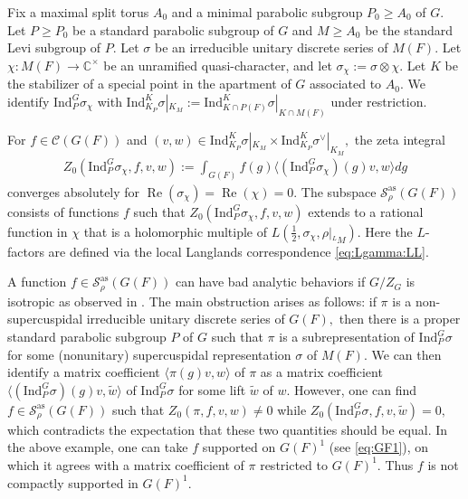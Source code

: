 \documentclass[10pt]{amsart}
\theoremstyle{definition}
\numberwithin{equation}{section}
\numberwithin{equation}{subsection}
\newcommand{\Ind}{\mathrm{Ind}}
\newcommand{\CC}{\mathbb{C}}
\renewcommand{\Re}{\mathop{\mathrm{Re}}}
\begin{document}
Fix a maximal split torus $A_0$ and a minimal parabolic subgroup $P_0\ge A_0$ of $G$. Let $P\ge P_0$ be a standard parabolic subgroup of $G$ and $M\ge A_0$ be the standard Levi subgroup of $P$. Let $\sigma$ be an irreducible unitary discrete series of $M(F)$. Let $\chi:M(F)\to \CC^\times$ be an unramified quasi-character, and let $\sigma_\chi:=\sigma\otimes \chi.$ Let $K$ be the stabilizer of a special point in the apartment of $G$ associated to $A_0$. We identify $\mathrm{Ind}_P^G\sigma_\chi$ with $\Ind_{K_P}^K\sigma|_{K_M}:=\Ind_{K\cap P(F)}^K\sigma|_{K\cap M(F)}$ under restriction.

For $f\in \mathcal{C}(G(F))$ and $(v,w)\in \Ind_{K_P}^K\sigma|_{K_M}\times \Ind_{K_P}^K\sigma^\lor|_{K_M},$ the zeta integral 
\begin{align*}
    Z_0(\mathrm{Ind}_P^G \sigma_\chi,f,v,w):=\int_{G(F)} f(g)\langle (\mathrm{Ind}_P^G\sigma_\chi)(g)v,w\rangle dg
\end{align*} 
converges absolutely for $\Re (\sigma_\chi)=\Re(\chi)=0.$ The subspace  $\mathcal{S}^{\mathrm{as}}_\rho(G(F))$ consists of functions $f$ such that $Z_0(\mathrm{Ind}_P^G \sigma_\chi,f,v,w)$ extends to a rational function in $\chi$ that is a holomorphic multiple of $L(\tfrac{1}{2},\sigma_\chi,\rho|_{{}^LM})$. Here the $L$-factors are defined via the local Langlands correspondence \eqref{eq:Lgamma:LL}. 

A function $f\in \mathcal{S}_\rho^{\mathrm{as}}(G(F))$ can have bad analytic behaviors if $G/Z_G$ is isotropic as observed in \cite[Example 6.2]{DRS}. The main obstruction arises as follows: if $\pi$ is a non-supercuspidal irreducible unitary discrete series of $G(F),$ then there is a proper standard parabolic subgroup $P$ of $G$  such that $\pi$ is a subrepresentation of $\Ind_P^G \sigma$ for some (nonunitary) supercuspidal representation $\sigma$ of $M(F).$ We can then identify a matrix coefficient $\langle \pi(g)v,w\rangle$ of $\pi$ as a matrix coefficient $\langle (\mathrm{Ind}_P^G\sigma)(g)v,\tilde{w}\rangle$ of $\Ind_P^G \sigma$ for some lift $\tilde{w}$ of $w$. However, one can find $f\in \mathcal{S}_\rho^{\mathrm{as}}(G(F))$ such that $Z_0(\pi,f,v,w)\neq 0$ while $Z_0(\mathrm{Ind}_P^G\sigma,f, v,\tilde{w})=0,$ which contradicts the expectation that these two quantities should be equal. In the above example, one can take $f$ supported on $G(F)^1$ (see \eqref{eq:GF1}), on which it agrees with a matrix coefficient of $\pi$ restricted to $G(F)^1$. Thus $f$ is not compactly supported in $G(F)^1.$
\end{document}
